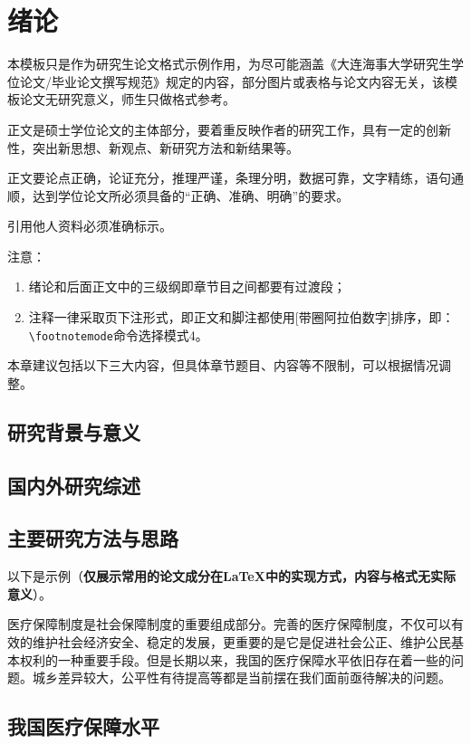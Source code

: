 
\section{绪论}

本模板只是作为研究生论文格式示例作用，为尽可能涵盖《大连海事大学研究生学位论文/毕业论文撰写规范》规定的内容，部分图片或表格与论文内容无关，该模板论文无研究意义，师生只做格式参考。

正文是硕士学位论文的主体部分，要着重反映作者的研究工作，具有一定的创新性，突出新思想、新观点、新研究方法和新结果等。

正文要论点正确，论证充分，推理严谨，条理分明，数据可靠，文字精练，语句通顺，达到学位论文所必须具备的“正确、准确、明确”的要求。

引用他人资料必须准确标示。

注意：
\begin{enumerate}[label=(\arabic*)]
  \item{绪论和后面正文中的三级纲即章节目之间都要有过渡段；}
  \item{注释一律采取页下注形式，即正文和脚注都使用[带圈阿拉伯数字]排序，即：\verb|\footnotemode|命令选择模式4。
  }
\end{enumerate}

本章建议包括以下三大内容，但具体章节题目、内容等不限制，可以根据情况调整。

\subsection{研究背景与意义}

\subsection{国内外研究综述}

\subsection{主要研究方法与思路}

以下是示例（{\bf 仅展示常用的论文成分在LaTeX中的实现方式，内容与格式无实际意义}）。

医疗保障制度是社会保障制度的重要组成部分。完善的医疗保障制度，不仅可以有效的维护社会经济安全、稳定的发展，更重要的是它是促进社会公正、维护公民基本权利的一种重要手段。但是长期以来，我国的医疗保障水平依旧存在着一些的问题。城乡差异较大，公平性有待提高等都是当前摆在我们面前亟待解决的问题。

\subsection{我国医疗保障水平}

